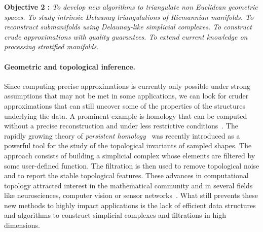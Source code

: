 
\vspace{2mm}

{\bf Objective 2 :}  {\em To   develop new algorithms to {\em  triangulate non Euclidean geometric spaces}. To study intrinsic Delaunay triangulations of Riemannian manifolds.  To reconstruct submanifolds using Delaunay-like simplicial complexes. To construct crude approximations 
with quality guarantees. To extend current knowledge on processing stratified manifolds. }

\paragraph{Geometric and topological inference.}
Since computing precise approximations is currently only possible under strong assumptions that may not be met in some applications, we can look for cruder approximations 
that can still  uncover some of the properties of the structures underlying the data.
%
%
A prominent example is homology that can be computed  without a precise reconstruction and under less restrictive conditions~\cite{geometrica-ccl09,nsw-fhm-2008}. The rapidly growing theory of {\em persistent homology}~\cite{eh-ph-2008,rg-bptd-2008} was recently introduced as a powerful tool for the study of the topological invariants of sampled shapes. The approach consists of building a simplicial complex whose elements are filtered by some user-defined function. The filtration is then used to remove topological noise and to report the stable topological features.  These advances in computational topology attracted interest in the mathematical community and in several fields like neurosciences, computer vision or sensor networks~\cite{fpgo-airc-2009,cids-lbsni-2008,dsrg-csnph-2007}.   What still prevents these new methods to highly impact  applications is the lack of efficient data structures and algorithms to construct simplicial complexes and filtrations in high dimensions.

